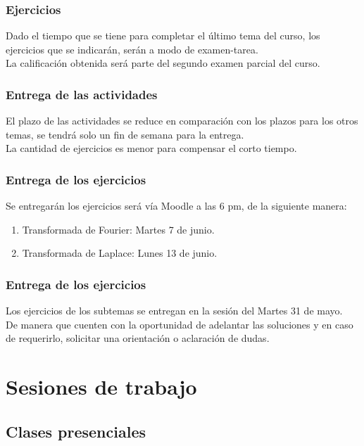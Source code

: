 \documentclass[12pt]{beamer}
\begin{document}
\begin{frame}
\frametitle{Ejercicios}
Dado el tiempo que se tiene para completar el último tema del curso, los ejercicios que se indicarán, \pause serán a modo de examen-tarea.
\\
\bigskip
\pause
La calificación obtenida será parte del segundo examen parcial del curso.
\end{frame}
\begin{frame}
\frametitle{Entrega de las actividades}
El plazo de las actividades se reduce en comparación con los plazos para los otros temas, \pause se tendrá solo un fin de semana para la entrega.
\\
\bigskip
\pause
La cantidad de ejercicios es menor para compensar el corto tiempo.
\end{frame}
\begin{frame}
\frametitle{Entrega de los ejercicios}
Se entregarán los ejercicios será vía Moodle a las 6 pm, de la siguiente manera:
\pause
{}
\begin{enumerate}[<+->]
\item Transformada de Fourier: Martes 7 de junio.
\item Transformada de Laplace: Lunes 13 de junio.
\end{enumerate}
\end{frame}
\begin{frame}
\frametitle{Entrega de los ejercicios}
Los ejercicios de los subtemas se entregan en la sesión del Martes 31 de mayo.
\\
\bigskip
\pause
De manera que cuenten con la oportunidad de adelantar las soluciones y en caso de requerirlo, solicitar una orientación o aclaración de dudas.
\end{frame}

\section{Sesiones de trabajo}
\subsection{Clases presenciales}
\end{document}
